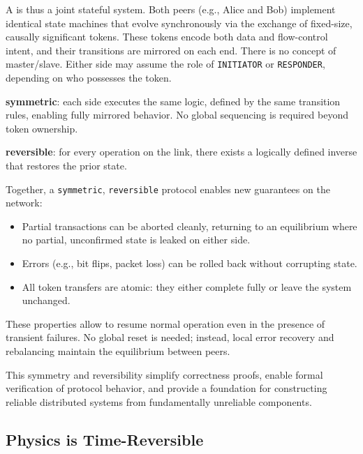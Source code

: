 \documentclass[../OAE-SPEC-MAIN.tex]{subfiles}
\begin{document}
A \LINK is thus a joint stateful system. Both peers (e.g., Alice and Bob) implement identical state machines that evolve synchronously via the exchange of fixed-size, causally significant tokens. These tokens encode both data and flow-control intent, and their transitions are mirrored on each end. There is no concept of master/slave. Either side may assume the role of \texttt{INITIATOR} or \texttt{RESPONDER}, depending on who possesses the token.

\begin{highlightbox}[Definitions]
\textbf{symmetric}: each side executes the same logic, defined by the same transition rules, enabling fully mirrored behavior. No global sequencing is required beyond token ownership.

\textbf{reversible}: for every operation on the link, there exists a logically defined inverse that restores the prior state.
\end{highlightbox}

Together, a \texttt{symmetric}, \texttt{reversible} protocol enables new guarantees on the network:
\begin{itemize}
\item Partial transactions can be aborted cleanly, returning to an equilibrium where no partial, unconfirmed state is leaked on either side.

\item Errors (e.g., bit flips, packet loss) can be rolled back without corrupting state.

\item All token transfers are atomic: they either complete fully or leave the system unchanged.
\end{itemize}

These properties allow \LINKs to resume normal operation even in the presence of transient failures. No global reset is needed; instead, local error recovery and rebalancing maintain the equilibrium between peers.

This symmetry and reversibility simplify correctness proofs, enable formal verification of protocol behavior, and provide a foundation for constructing reliable distributed systems from fundamentally unreliable components.


\subsection*{Physics is Time-Reversible}
\end{document}
